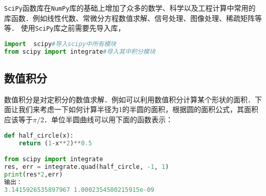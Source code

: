 \verb|SciPy|函数库在\verb|NumPy|库的基础上增加了众多的数学、科学以及工程计算中常用的库函数．例如线性代数、常微分方程数值求解、信号处理、图像处理、稀疏矩阵等等．
使用\verb|SciPy|库之前需要先导入库，
\begin{lstlisting}[language=python]
import  scipy#导入scipy中所有模块
from scipy import integrate#导入其中积分模块
\end{lstlisting}
\subsection{数值积分}
数值积分是对定积分的数值求解．例如可以利用数值积分计算某个形状的面积．下面让我们来考虑一下如何计算半径为1的半圆的面积，根据圆的面积公式，其面积应该等于$\pi/2$．单位半圆曲线可以用下面的函数表示：
\begin{lstlisting}[language=python]
def half_circle(x):
    return (1-x**2)**0.5

from scipy import integrate
res, err = integrate.quad(half_circle, -1, 1)
print(res*2,err)
输出：
3.1415926535897967 1.0002354500215915e-09
\end{lstlisting}
